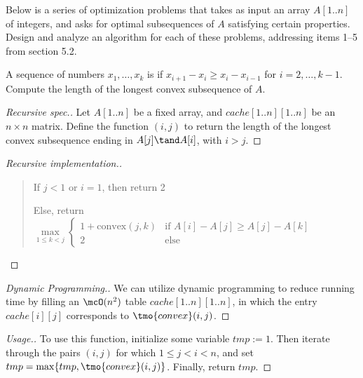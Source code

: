 \documentclass{article}
\begin{document}
 Below is a series of optimization problems that takes as input an array \( A[1..n] \) of integers, and asks for optimal subsequences of \( A \) satisfying certain properties. Design and analyze an algorithm for each of these problems, addressing items 1--5 from section 5.2.
\setcounter{section}{5}
\setcounter{exercise}{1}
\setcounter{subexercise}{1}
\begin{subexercise}
  A sequence of numbers \( x_1,\ldots,x_k \) is  if \( x_{i+1}-x_i \geq x_i-x_{i-1} \) for \( i=2,\ldots,k-1 \). Compute the length of the longest convex subsequence of \( A \).
\end{subexercise}

\begin{proof}[Recursive spec.]
Let \( A[1..n] \) be a fixed array, and \( cache[1..n][1..n] \) be an \( n\times n \) matrix. Define the function \( (i,j) \) to return the length of the longest convex subsequence ending in \( A[j]\tand A[i] \), with \( i>j \).
\end{proof}

\begin{proof}[Recursive implementation.]\
\begin{quote}
\begin{steps}
  \item If \( j < 1 \) or \( i = 1 \), then return 2
  \item Else, return $ \max\limits_{1\leq k < j}
  \begin{cases}
    1 + \text{convex}(j, k) & \text{if } A[i] - A[j] \geq A[j] - A[k] \\
    2 & \text{else}
  \end{cases} $
\end{steps}
\end{quote}
\end{proof}

\begin{proof}[Dynamic Programming.]
 We can utilize dynamic programming to reduce running time by filling an \( \mcO(n^2) \) table \( cache[1..n][1..n] \), in which the entry \( cache[i][j] \) corresponds to \( \tmo{convex}(i,j) \).
\end{proof}

\begin{proof}[Usage.]
  To use this function, initialize some variable \( tmp := 1 \). Then iterate through the pairs \( (i,j) \) for which \( 1 \leq j < i < n \), and set \( tmp = \max\{tmp, \tmo{convex}(i,j)\} \). Finally, return \( tmp \).
\end{proof}
\end{document}
